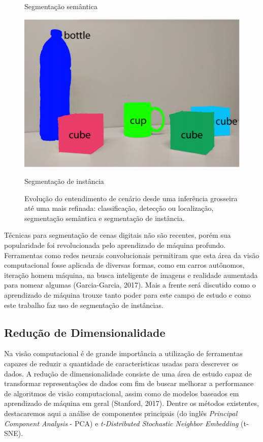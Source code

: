 \documentclass[12pt]{report}
\begin{document}
\begin{figure}
\begin{minipage}[b]{0.4\textwidth}
    \caption{Segmentação semântica}
  \end{minipage}
    \hfill
  \begin{minipage}[b]{0.4\textwidth}
    \includegraphics[width=\textwidth]{images/seg4.png}
    \caption{Segmentação de instância}
  \end{minipage}
  \caption{Evolução do entendimento de cenário desde uma inferência grosseira até uma mais refinada: classificação, detecção ou localização, segmentação semântica e segmentação de instância.}
  \label{fig:seg}
\end{figure}

Técnicas para segmentação de cenas digitais não são recentes, porém sua popularidade foi revolucionada pelo aprendizado de máquina profundo. Ferramentas como redes neurais convolucionais permitiram que esta área da visão computacional fosse aplicada de diversas formas, como em carros autônomos, iteração homem máquina, na busca inteligente de imagens e realidade aumentada para nomear algumas (Garcia-Garcia, 2017). Mais a frente será discutido como o aprendizado de máquina trouxe tanto poder para este campo de estudo e como este trabalho faz uso de segmentação de instâncias.

\subsection{Redução de Dimensionalidade}

Na visão computacional é de grande importância a utilização de ferramentas capazes de reduzir a quantidade de características usadas para descrever os dados. A redução de dimensionalidade consiste de uma área de estudo capaz de transformar representações de dados com fim de buscar melhorar a performance de algoritmos de visão computacional, assim como de modelos baseados em aprendizado de máquina em geral (Stanford, 2017). Dentre os métodos existentes, destacaremos aqui a análise de componentes principais (do inglês \textit{Principal Component Analysis} - PCA) e \textit{t-Distributed Stochastic Neighbor Embedding} (t-SNE).
\end{document}

